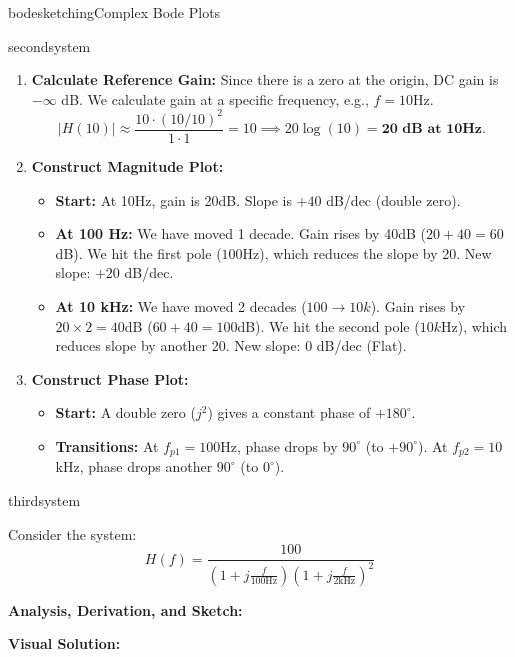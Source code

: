 \begin{mainquestion}{bodesketching}{Complex Bode Plots}
\begin{partquestion}{secondsystem}
\begin{answer}
\begin{enumerate}
        \item \textbf{Calculate Reference Gain:}
        Since there is a zero at the origin, DC gain is $-\infty$ dB. We calculate gain at a specific frequency, e.g., $f=10\text{Hz}$.
        \[ |H(10)| \approx \frac{10 \cdot (10/10)^2}{1 \cdot 1} = 10 \implies 20\log(10) = \textbf{20 dB at 10Hz}. \]
        
        \item \textbf{Construct Magnitude Plot:}
        \begin{itemize}
            \item \textbf{Start:} At 10Hz, gain is 20dB. Slope is $+40$ dB/dec (double zero).
            \item \textbf{At 100 Hz:} We have moved 1 decade. Gain rises by 40dB ($20+40=60$dB). We hit the first pole ($100$Hz), which reduces the slope by 20. New slope: $+20$ dB/dec.
            \item \textbf{At 10 kHz:} We have moved 2 decades ($100 \to 10k$). Gain rises by $20 \times 2 = 40$dB ($60+40=100$dB). We hit the second pole ($10k$Hz), which reduces slope by another 20. New slope: $0$ dB/dec (Flat).
        \end{itemize}

        \item \textbf{Construct Phase Plot:}
        \begin{itemize}
            \item \textbf{Start:} A double zero ($j^2$) gives a constant phase of $+180^\circ$.
            \item \textbf{Transitions:} At $f_{p1}=100$Hz, phase drops by $90^\circ$ (to $+90^\circ$). At $f_{p2}=10$kHz, phase drops another $90^\circ$ (to $0^\circ$).
        \end{itemize}
    \end{enumerate}
\end{answer}

    \qnewpage

\end{partquestion}

\begin{partquestion}{thirdsystem}
{Consider the system:
    \[ H(f) = \frac{100}{(1 + j\frac{f}{100\text{Hz}})(1 + j\frac{f}{2\text{kHz}})^2} \]
    
    \textbf{Analysis, Derivation, and Sketch:}}

\begin{answer}
    \textbf{Visual Solution:}


\end{answer}
\end{partquestion}
\end{mainquestion}
